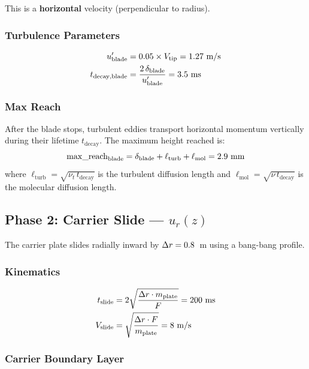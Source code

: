 \documentclass[11pt,a4paper]{article}
\begin{document}
This is a \textbf{horizontal} velocity (perpendicular to radius).

\subsubsection{Turbulence Parameters}

\begin{align}
  u'_\mathrm{blade} &= 0.05 \times V_\mathrm{tip} = 1.27~\text{m/s} \\
  t_\mathrm{decay,blade} &= \frac{2\,\delta_\mathrm{blade}}{u'_\mathrm{blade}} = 3.5~\text{ms}
\end{align}

\subsubsection{Max Reach}

After the blade stops, turbulent eddies transport horizontal momentum vertically
during their lifetime $t_\mathrm{decay}$. The maximum height reached is:
\begin{equation}
  \mathrm{max\_reach}_\mathrm{blade} = \delta_\mathrm{blade} + \ell_\mathrm{turb} + \ell_\mathrm{mol}
    = 2.9~\text{mm}
\end{equation}
where $\ell_\mathrm{turb} = \sqrt{\nu_t \, t_\mathrm{decay}}$ is the turbulent
diffusion length and $\ell_\mathrm{mol} = \sqrt{\nu \, t_\mathrm{decay}}$ is
the molecular diffusion length.

\subsection{Phase 2: Carrier Slide --- $u_r(z)$}

The carrier plate slides radially inward by $\Delta r = 0.8$~m using a
bang-bang profile.

\subsubsection{Kinematics}

\begin{align}
  t_\mathrm{slide} &= 2\sqrt{\frac{\Delta r \cdot m_\mathrm{plate}}{F}} = 200~\text{ms} \\
  V_\mathrm{slide} &= \sqrt{\frac{\Delta r \cdot F}{m_\mathrm{plate}}} = 8~\text{m/s}
\end{align}

\subsubsection{Carrier Boundary Layer}
\end{document}
